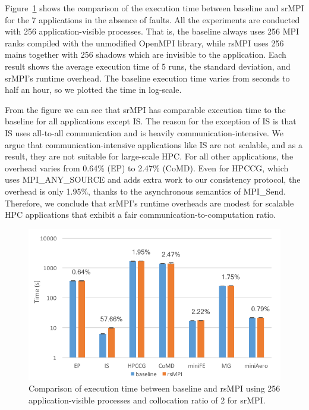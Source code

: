 Figure~\ref{fig:runtime_overhead} shows the comparison of the execution time between baseline and srMPI for the 7 applications in the absence of faults. All the experiments are conducted with 256 application-visible processes. That is, the baseline always uses 256 MPI ranks compiled with the unmodified OpenMPI library, while rsMPI uses 256 mains together with 256 shadows which are invisible to the application. Each result shows the average execution time of 5 runs, the standard deviation, and srMPI's runtime overhead. The baseline execution time varies from seconds to half an hour, so we plotted the time in log-scale. 

From the figure we can see that srMPI has comparable execution time to the baseline for all applications except IS. The reason for the exception of IS is that IS uses all-to-all communication and is heavily communication-intensive. %
We argue that communication-intensive applications like IS are not scalable, and as a result, they are not suitable for large-scale HPC. 
For all other applications, the overhead varies from 0.64\% (EP) to 2.47\% (CoMD). Even for HPCCG, which uses MPI\_ANY\_SOURCE and adds extra work to our consistency protocol, the overhead is only 1.95\%, thanks to the asynchronous semantics of MPI\_Send. Therefore, we conclude that srMPI's runtime overheads are modest for scalable HPC applications that exhibit a fair communication-to-computation ratio.

\begin{figure}[!t]
  \begin{center}
      \includegraphics[width=\columnwidth]{figures/runtime_overhead}
  \end{center}
  \caption{Comparison of execution time between baseline and rsMPI using 256 application-visible processes and collocation ratio of 2 for srMPI.}
  \label{fig:runtime_overhead}
  \vspace{-0.1in}
\end{figure}

